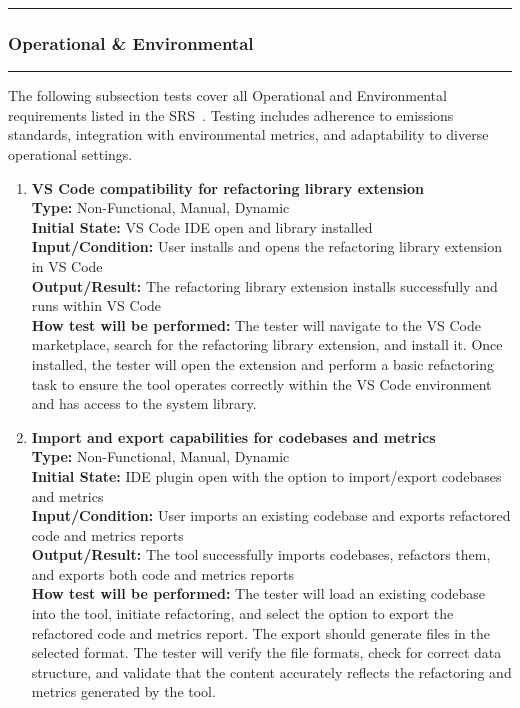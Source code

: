 \documentclass[12pt, titlepage]{article}
\newcommand{\colorrule}{\textcolor{BlueViolet}{\rule{\linewidth}{2pt}}}
\begin{document}
\noindent
\colorrule

\subsubsection{Operational \& Environmental}
\colorrule

\medskip

\noindent
The following subsection tests cover all Operational and Environmental requirements listed in the SRS~\cite{SRS}. Testing includes adherence to emissions standards, integration with environmental metrics, and adaptability to diverse operational settings.

\begin{enumerate}[label={\bf \textcolor{Maroon}{test-OPE-\arabic*}}, wide=0pt, font=\itshape]
  \item \textbf{VS Code compatibility for refactoring library extension} \\[2mm]
    \textbf{Type:} Non-Functional, Manual, Dynamic \\
    \textbf{Initial State:} VS Code IDE open and library installed\\
    \textbf{Input/Condition:} User installs and opens the refactoring library extension in VS Code \\
    \textbf{Output/Result:} The refactoring library extension installs successfully and runs within VS Code \\[2mm]
    \textbf{How test will be performed:} The tester will navigate to the VS Code marketplace, search for the refactoring library extension, and install it. Once installed, the tester will open the extension and perform a basic refactoring task to ensure the tool operates correctly within the VS Code environment and has access to the system library.

  \item \textbf{Import and export capabilities for codebases and metrics} \\[2mm]
    \textbf{Type:} Non-Functional, Manual, Dynamic \\
    \textbf{Initial State:} IDE plugin open with the option to import/export codebases and metrics \\
    \textbf{Input/Condition:} User imports an existing codebase and exports refactored code and metrics reports \\
    \textbf{Output/Result:} The tool successfully imports codebases, refactors them, and exports both code and metrics reports \\[2mm]
    \textbf{How test will be performed:} The tester will load an existing codebase into the tool, initiate refactoring, and select the option to export the refactored code and metrics report. The export should generate files in the selected format. The tester will verify the file formats, check for correct data structure, and validate that the content accurately reflects the refactoring and metrics generated by the tool.


\end{enumerate}
\end{document}
